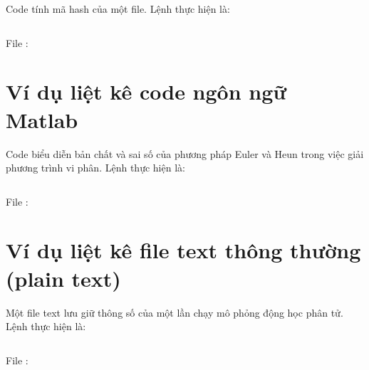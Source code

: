 Code tính mã hash của một file. Lệnh thực hiện là:
\begin{Verbatim}

\end{Verbatim}

File :




\section{Ví dụ liệt kê code ngôn ngữ Matlab}

Code biểu diễn bản chất và sai số của phương pháp Euler và Heun trong việc giải phương trình vi phân. Lệnh thực hiện là:
\begin{Verbatim}

\end{Verbatim}

File :




\section{Ví dụ liệt kê file text thông thường (plain text)}

Một file text lưu giữ thông số của một lần chạy mô phỏng động học phân tử. Lệnh thực hiện là:
\begin{Verbatim}

\end{Verbatim}

File :





